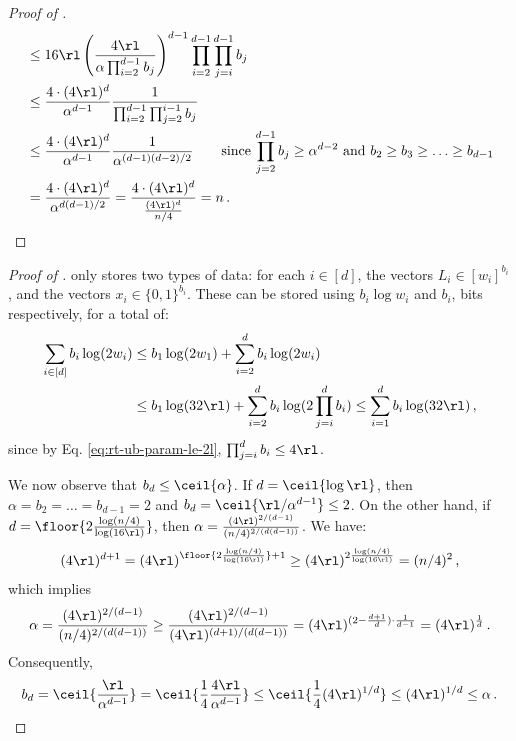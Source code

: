\begin{proof}[Proof of ]
\begin{align*}
      &\le 16 \rl \left(\frac{4 \rl}{\alpha \prod_{i=2}^{d-1} b_j} \right)^{d-1} \prod_{i = 2}^{d-1} \prod_{j=i}^{d-1} b_j \\
      &\le \frac{4 \cdot (4 \rl)^d}{\alpha^{d-1}} \frac{1}{\prod_{i = 2}^{d-1} \prod_{j=2}^{i-1} b_j} \\
      &\le \frac{4 \cdot(4 \rl)^d}{\alpha^{d-1}} \frac{1}{\alpha^{(d-1)(d-2)/2}} \qquad \text{since $\prod_{j=2}^{d-1} b_j \ge \alpha^{d-2}$ and $b_2 \ge b_3 \ge \ldots \ge b_{d-1}$} \\
      &= \frac{4 \cdot(4 \rl)^d}{\alpha^{d(d-1)/2}} = \frac{4 \cdot(4 \rl)^{d}}{\frac{(4 \rl)^d}{n / 4}} = n \,. \qedhere
  \end{align*}
\end{proof}




\begin{proof}[Proof of ]
   only stores two types of data: for each $i\in[d]$, the vectors $L_i \in [w_i]^{b_i}$, and the vectors $x_i \in \{0,1\}^{b_i}$. These can be stored using $b_i \log w_i$ and $b_i$, bits respectively, for a total of:
  \begin{align*}
    \sum_{i \in [d]} b_i \log(2 w_i) &\le b_1 \log(2 w_1) + \sum_{i = 2}^{d} b_i \log(2 w_i) \\
      &\le b_1 \log(32 \rl) + \sum_{i = 2}^{d} b_i \log(2 \prod_{j=i}^{d} b_i)
      \le \sum_{i=1}^{d} b_i \log(32 \rl) \,,
  \end{align*}
  since by Eq. \ref{eq:rt-ub-param-le-2l}, $\prod_{j=i}^{d} b_i \le 4 \rl$. 
  
  We now observe that $b_d \le \ceil{\alpha}$. If $d = \ceil{\log \rl}$,
  then $\alpha = b_2 = \ldots = b_{d - 1} = 2$ and $b_d = \ceil{\rl/\alpha^{d - 1}} \le 2$. On the other hand, if $d = \floor{2 \frac{\log(n/4)}{\log(16\rl)}}$, then $\alpha = \frac{(4 \rl)^{2/(d-1)}}{(n/4)^{2/(d(d-1))}}$. We have:
  \begin{align*}
    (4\rl)^{d + 1} = (4\rl)^{\floor{2 \frac{\log(n/4)}{\log(16\rl)}} + 1} \ge (4\rl)^{2 \frac{\log(n/4)}{\log(16\rl)}} = (n/4)^2 \,,
  \end{align*}
  which implies
  \begin{align*}
    \alpha = \frac{(4 \rl)^{2/(d-1)}}{(n/4)^{2/(d(d-1))}} \ge \frac{(4 \rl)^{2/(d-1)}}{(4\rl)^{(d+1)/(d(d-1))}} = (4\rl)^{(2 - \frac{d+1}{d}) \cdot \frac{1}{d - 1}} = (4\rl)^{\frac{1}{d}} \,.
  \end{align*}
  Consequently,
  \begin{align*}
    b_d = \ceil{\frac{\rl}{\alpha^{d - 1}}} = \ceil{\frac{1}{4} \frac{4 \rl}{\alpha^{d - 1}}} \le \ceil{\frac{1}{4} (4 \rl)^{1/d}} \le (4 \rl)^{1/d} \le \alpha \,.
  \end{align*}
  

\end{proof}
